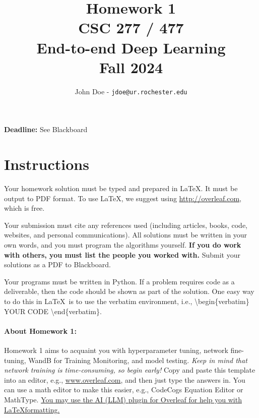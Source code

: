 \documentclass[11pt, oneside]{article}   	%
\title{Homework 1 \\ CSC 277 / 477 \\ End-to-end Deep Learning \\ Fall 2024}
\author{John Doe - \texttt{jdoe@ur.rochester.edu}}
\date{}
\begin{document}
\maketitle

\begin{center}
    \textbf{Deadline:} See Blackboard    
\end{center}


\section*{Instructions}

Your homework solution must be typed and prepared in \LaTeX. It must be output to PDF format. To use \LaTeX, we suggest using \url{http://overleaf.com}, which is free.

Your submission must cite any references used (including articles, books, code, websites, and personal communications).  All solutions must be written in your own words, and you must program the algorithms yourself. \textbf{If you do work with others, you must list the people you worked with.} Submit your solutions as a PDF to Blackboard. 


Your programs must be written in Python. 
If a problem requires code as a deliverable, then the code should be shown as part of the solution. One easy way to do this in \LaTeX \, is to use the verbatim environment, i.e., \textbackslash begin\{verbatim\} YOUR CODE \textbackslash end\{verbatim\}.




\paragraph{About Homework 1:} Homework 1 aims to acquaint you with hyperparameter tuning, network fine-tuning, WandB for Training Monitoring, and model testing. \emph{Keep in mind that network training is time-consuming, so begin early!} Copy and paste this template into an editor, e.g., \url{www.overleaf.com}, and then just type the answers in. You can use a math editor to make this easier, e.g., CodeCogs Equation Editor or MathType. \href{https://blog.writefull.com/texgpt-harness-the-power-of-chatgpt-in-overleaf/}{You may use the AI (LLM) plugin for Overleaf for help you with \LaTeX formatting.}



\end{document}
